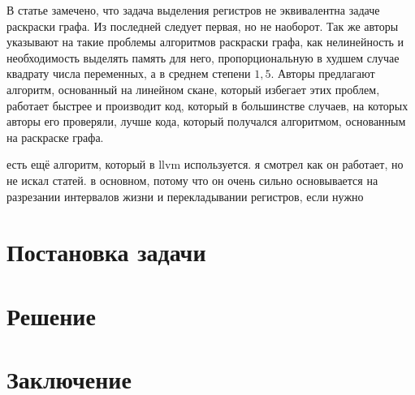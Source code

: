 \documentclass[a4paper,14pt]{extarticle}
\begin{document}
В статье \cite{krishnamurthi_extended_2007} замечено, что задача выделения регистров не эквивалентна задаче раскраски графа. Из последней следует первая, но не наоборот. Так же авторы указывают на такие проблемы алгоритмов раскраски графа, как нелинейность и необходимость выделять память для него, пропорциональную в худшем случае квадрату числа переменных, а в среднем степени $1,5$. Авторы предлагают алгоритм, основанный на линейном скане, который избегает этих проблем, работает быстрее и производит код, который в большинстве случаев, на которых авторы его проверяли, лучше кода, который получался алгоритмом, основанным на раскраске графа.

{\color{red} есть ещё алгоритм, который в llvm используется. я смотрел как он работает, но не искал статей. в основном, потому что он очень сильно основывается на разрезании интервалов жизни и перекладывании регистров, если нужно}

\section{Постановка задачи}

\section{Решение}

\section{Заключение}

\newpage



\end{document}
